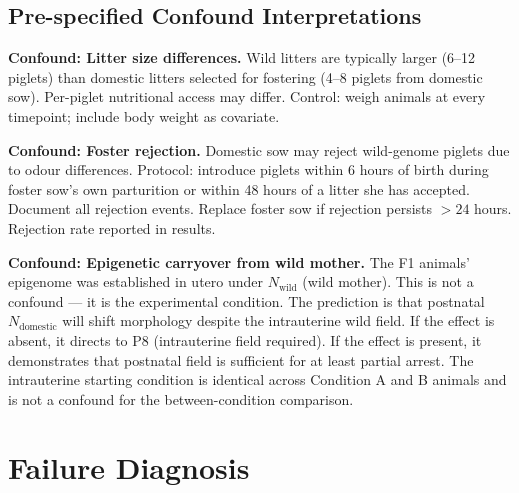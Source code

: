 \documentclass[10pt, a4paper]{article}
\begin{document}
\subsection{Pre-specified Confound Interpretations}

\textbf{Confound: Litter size differences.}
Wild litters are typically larger (6--12 piglets)
than domestic litters selected for fostering
(4--8 piglets from domestic sow). Per-piglet
nutritional access may differ. Control: weigh
animals at every timepoint; include body weight
as covariate.

\textbf{Confound: Foster rejection.}
Domestic sow may reject wild-genome piglets
due to odour differences. Protocol: introduce
piglets within 6 hours of birth during foster
sow's own parturition or within 48 hours of
a litter she has accepted. Document all
rejection events. Replace foster sow if
rejection persists $> 24$ hours. Rejection
rate reported in results.

\textbf{Confound: Epigenetic carryover from
wild mother.}
The F1 animals' epigenome was established in
utero under $N_{\text{wild}}$ (wild mother).
This is not a confound --- it is the experimental
condition. The prediction is that postnatal
$N_{\text{domestic}}$ will shift morphology
despite the intrauterine wild field. If the
effect is absent, it directs to P8 (intrauterine
field required). If the effect is present, it
demonstrates that postnatal field is sufficient
for at least partial arrest. The intrauterine
starting condition is identical across Condition
A and B animals and is not a confound for the
between-condition comparison.

\section{Failure Diagnosis}
\label{sec:failure}
\end{document}
